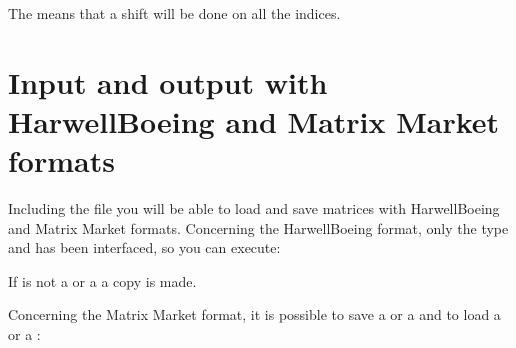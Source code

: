 \documentclass[a4paper,11pt,english]{sphinxmanual}
\begin{document}
The  means that a shift will be done on all the indices.


\chapter{Input and output with Harwell\sphinxhyphen{}Boeing and Matrix Market formats}
\label{\detokenize{gmm/export:input-and-output-with-harwell-boeing-and-matrix-market-formats}}\label{\detokenize{gmm/export:gmm-export}}\label{\detokenize{gmm/export::doc}}
Including the file  you will be able to load and save matrices with Harwell\sphinxhyphen{}Boeing and Matrix Market formats. Concerning the Harwell\sphinxhyphen{}Boeing format, only the type  and  has been interfaced, so you can execute:

\begin{sphinxVerbatim}[commandchars=\\\{\}]
  
  
\end{sphinxVerbatim}

If  is not a   or a  a copy is made.

Concerning the Matrix Market format, it is possible to save a  or a   and to load a  or a :

\begin{sphinxVerbatim}[commandchars=\\\{\}]
  
  
\end{sphinxVerbatim}
\end{document}
